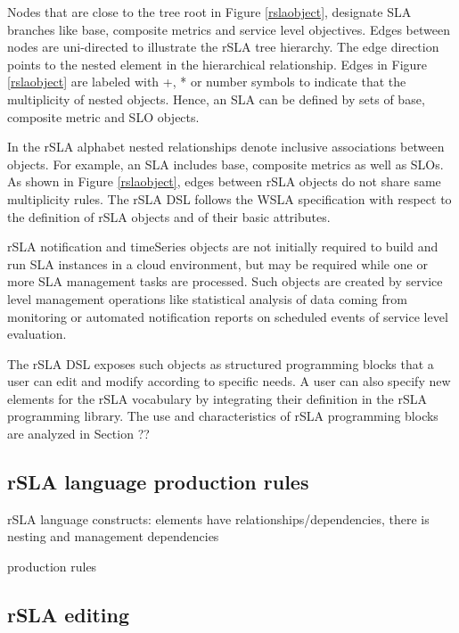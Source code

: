 Nodes that are close to the tree root in Figure \ref{rslaobject}, designate SLA branches like base, composite metrics and service level objectives. Edges between nodes are uni-directed to illustrate the rSLA tree hierarchy. The edge direction points to the nested element in the hierarchical relationship. 
Edges in Figure \ref{rslaobject} are labeled with +, * or number symbols to indicate that the multiplicity of nested objects. Hence, an SLA can be defined by sets of base, composite metric and SLO objects.

In the rSLA alphabet nested relationships denote inclusive associations between objects. For example, an SLA includes base, composite metrics as well as SLOs. As shown in Figure \ref{rslaobject}, edges between  rSLA objects do not share same multiplicity rules. The rSLA DSL follows the WSLA 
specification \cite{wsla} with respect to the definition of rSLA objects and of their basic attributes.

rSLA notification and timeSeries objects are not initially required to build and run SLA instances in a cloud environment, but may be required while one or more SLA management tasks are processed. Such objects are created by service level management operations like statistical analysis of data coming from monitoring or automated notification reports on scheduled events of service level evaluation. 

The rSLA DSL exposes such objects as structured programming blocks that a user can edit and modify according to specific needs. A user can also specify new elements for the rSLA vocabulary by integrating their definition in the rSLA programming library. The use and characteristics of rSLA programming blocks are analyzed in Section ??

\subsection{rSLA language production rules}

rSLA language constructs: elements have relationships/dependencies, there is nesting and management dependencies

production rules

\subsection{rSLA editing}